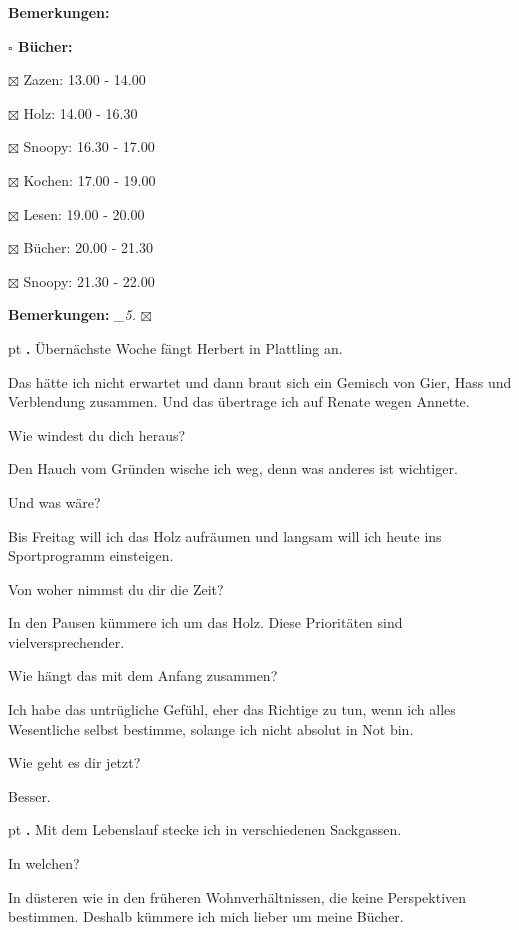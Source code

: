 \documentclass[10pt,a4paper]{article}
\newcounter{notec}
\newcommand\notep[1]{%
  \stepcounter{notec}
  \vskip #1pt
  {\bf\arabic{notec}.}
}
\newcommand\prop[1] {{\color {alizarin} {\bf #1}}}        %
\newcommand\mand[1] {{\color {burntorange} {\bf #1}}}     %
\newcommand\bottomspace{\vskip 4pt}
\newcommand\n[1] { {\sl #1.} \hskip 5pt }
\begin{document}
\begin{mdframed}[style=daystyle]
\begin{labeling}{{\mand {Bemerkungen:}}}
\begin{minipage}{0.75\textwidth}
\begin{labeling}{\prop {$\square$ { Bücher:}}}
      \item[$\boxtimes$ Zazen:]   13.00 - 14.00
      \item[$\boxtimes$ Holz:]    14.00 - 16.30
      \item[$\boxtimes$ Snoopy:]  16.30 - 17.00        
      \item[$\boxtimes$ Kochen:]  17.00 - 19.00        
      \item[$\boxtimes$ Lesen:]   19.00 - 20.00
      \item[$\boxtimes$ Bücher:]  20.00 - 21.30
      \item[$\boxtimes$ Snoopy:]  21.30 - 22.00
      \end{labeling}
    \end{minipage}
    \bottomspace
  \item[{\mand {Bemerkungen:}}]   \n{\_5} $\boxtimes$
  \end{labeling}
    
  \setcounter{notec}{0}
  
  \notep 0 Übernächste Woche fängt Herbert in Plattling an.

  \vskip 2pt
  Das hätte ich nicht erwartet und dann braut sich ein Gemisch von Gier, Hass und
  Verblendung zusammen. Und das übertrage ich auf Renate wegen Annette.

  \vskip 2pt
  Wie windest du dich heraus?

  \vskip 2pt
  Den Hauch vom Gründen wische ich weg, denn was anderes ist wichtiger.

  \vskip 2pt
  Und was wäre?

  \vskip 2pt
  Bis Freitag will ich das Holz aufräumen und langsam will ich heute ins
  Sportprogramm einsteigen.

  \vskip 2pt
  Von woher nimmst du dir die Zeit?

  \vskip 2pt
  In den Pausen kümmere ich um das Holz. Diese Prioritäten sind
  vielversprechender.

  \vskip 2pt
  Wie hängt das mit dem Anfang zusammen?

  \vskip 2pt
  Ich habe das untrügliche Gefühl, eher das Richtige zu tun, wenn ich alles
  Wesentliche selbst bestimme, solange ich nicht absolut in Not bin.

  \vskip 2pt
  Wie geht es dir jetzt?

  \vskip 2pt
  Besser.

  \notep 4 Mit dem Lebenslauf stecke ich in verschiedenen Sackgassen.

  \vskip 2pt
  In welchen?

  \vskip 2pt
  In düsteren wie in den früheren Wohnverhältnissen, die keine Perspektiven
  bestimmen. Deshalb kümmere ich mich lieber um meine Bücher.

\end{mdframed}
\end{document}
